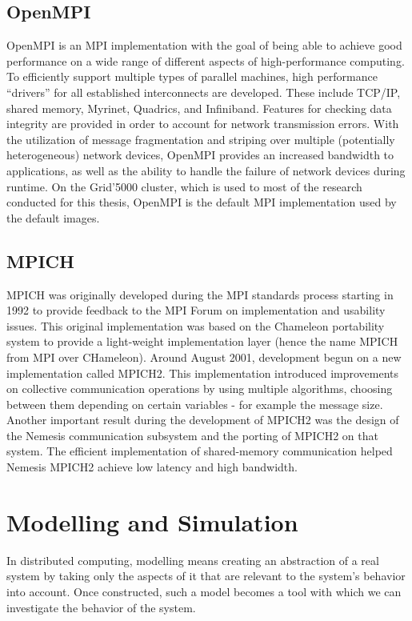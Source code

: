 \subsection{OpenMPI}
OpenMPI is an MPI implementation with the goal of being able to
achieve good performance on a wide range of different aspects of
high-performance computing. To efficiently support multiple types of
parallel machines, high performance “drivers” for all established
interconnects are developed. These include TCP/IP, shared memory,
Myrinet, Quadrics, and Infiniband. Features for checking data
integrity are provided in order to account for network transmission
errors. With the utilization of message fragmentation and striping
over multiple (potentially heterogeneous) network devices, OpenMPI
provides an increased bandwidth to applications, as well as the
ability to handle the failure of network devices during
runtime.\cite{ompi04} On the Grid'5000 cluster, which is used to most
of the research conducted for this thesis, OpenMPI is the default MPI
implementation used by the default images.
\subsection{MPICH}
MPICH\cite{glds96}\cite{gl96} was originally developed during the MPI
standards process starting in 1992 to provide feedback to the MPI
Forum on implementation and usability issues. This original
implementation was based on the Chameleon portability system to
provide a light-weight implementation layer (hence the name MPICH from
MPI over CHameleon). Around August 2001, development begun on a new
implementation called MPICH2.\cite{g02} This implementation
introduced improvements on collective communication operations by
using multiple algorithms, choosing between them depending on certain
variables - for example the message size.\cite{trg05} Another
important result during the development of MPICH2 was the design of
the Nemesis communication subsystem and the porting of MPICH2 on that
system. The efficient implementation of shared-memory communication
helped Nemesis MPICH2 achieve low latency and high
bandwidth.\cite{bmg07}
\section{Modelling and Simulation}
In distributed computing, modelling means creating an abstraction of a
real system by taking only the aspects of it that are relevant to the
system's behavior into account. Once constructed, such a model becomes
a tool with which we can investigate the behavior of the
system.\cite{h12_1}
